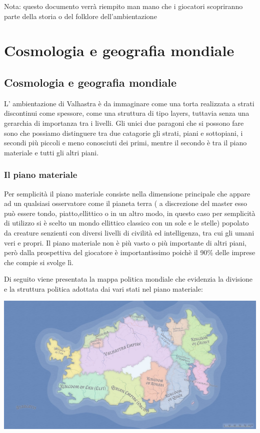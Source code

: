 \documentclass[a4paper,12pt]{book}
\begin{document}
\saltariga

Nota: questo documento verrà riempito man mano che i giocatori scopriranno parte della storia o del folklore dell'ambientazione

\saltariga
\chapter{Cosmologia e geografia mondiale}
\section{Cosmologia e geografia mondiale}

L' ambientazione di Valhastra è da immaginare come una torta realizzata a strati discontinui come spessore, come una struttura di tipo layers, tuttavia senza una gerarchia di importanza tra i livelli.
Gli unici due paragoni che si possono fare sono che possiamo distinguere tra due catagorie gli strati, piani e sottopiani, i secondi più piccoli e meno conosciuti dei primi, mentre il secondo è tra il piano materiale e tutti gli altri piani.

\subsection{Il piano materiale}
Per semplicità il piano materiale consiste nella dimensione principale che appare ad un qualsiasi osservatore come il pianeta terra ( a discrezione del master esso può essere tondo, piatto,ellittico o in un altro modo, in questo caso per semplicità di utilizzo si è scelto un mondo ellittico classico con un sole e le stelle) popolato da creature senzienti con diversi livelli di civilità ed intelligenza, tra cui gli umani veri e propri.
Il piano materiale non è più vasto o più importante di altri piani, però dalla prospettiva del giocatore è importantissimo poichè il 90\% delle imprese che compie si svolge lì.

Di seguito viene presentata la mappa politica mondiale che evidenzia la divisione e la struttura politica adottata dai vari stati nel piano materiale:

\includegraphics[scale=0.3]{mappaValhastra.jpeg}
\newpage
\end{document}
